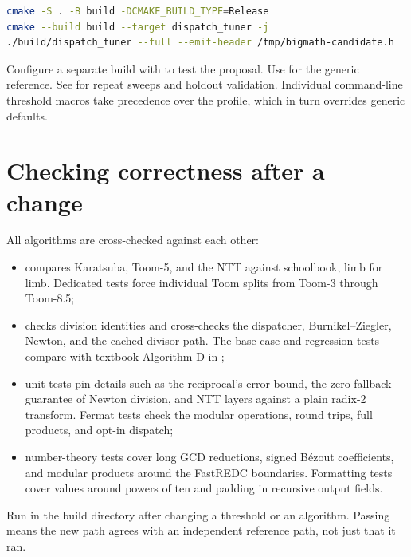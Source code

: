 \begin{lstlisting}[language=bash]
cmake -S . -B build -DCMAKE_BUILD_TYPE=Release
cmake --build build --target dispatch_tuner -j
./build/dispatch_tuner --full --emit-header /tmp/bigmath-candidate.h
\end{lstlisting}

Configure a separate build with
 to test the
proposal. Use  for the generic
reference. See  for repeat sweeps and
holdout validation. Individual command-line threshold macros take
precedence over the profile, which in turn overrides generic defaults.

\section{Checking correctness after a change}

All algorithms are cross-checked against each other:

\begin{itemize}
  \item {} compares Karatsuba, Toom-5, and the NTT
        against schoolbook, limb for limb. Dedicated tests force individual
        Toom splits from Toom-3 through Toom-8.5;
  \item {} checks division identities and cross-checks the dispatcher,
        Burnikel--Ziegler, Newton, and the cached divisor path. The base-case and regression
        tests compare  with textbook Algorithm D in
        ;
  \item unit tests pin details such as the reciprocal's error bound, the zero-fallback guarantee
        of Newton division, and NTT layers against a plain radix-2 transform. Fermat tests
        check the modular operations, round trips, full products, and opt-in dispatch;
  \item number-theory tests cover long GCD reductions, signed B\'ezout coefficients,
        and modular products around the FastREDC boundaries. Formatting tests cover
        values around powers of ten and padding in recursive output fields.
\end{itemize}

Run  in the build directory after changing a threshold or an
algorithm. Passing means the new path agrees with an independent reference path, not just that it
ran.
